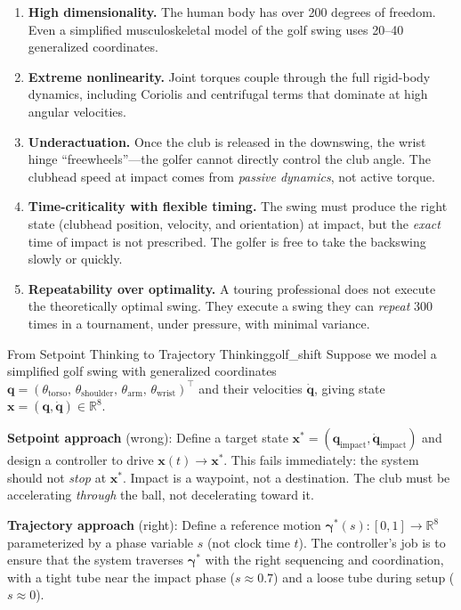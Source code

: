 \documentclass[12pt, openany]{book}
\theoremstyle{plain}
\newcommand{\state}{\bm{x}}
\newcommand{\traj}{\bm{\gamma}}
\newcommand{\Reals}{\mathbb{R}}
\begin{document}
\begin{enumerate}[label=(\roman*)]
  \item \textbf{High dimensionality.} The human body has over 200 degrees of freedom.
        Even a simplified musculoskeletal model of the golf swing uses 20--40
        generalized coordinates.
  \item \textbf{Extreme nonlinearity.} Joint torques couple through the full rigid-body
        dynamics, including Coriolis and centrifugal terms that dominate at high
        angular velocities.
  \item \textbf{Underactuation.} Once the club is released in the downswing, the
        wrist hinge ``freewheels''---the golfer cannot directly control the club angle.
        The clubhead speed at impact comes from \emph{passive dynamics}, not
        active torque.
  \item \textbf{Time-criticality with flexible timing.} The swing must produce the
        right state (clubhead position, velocity, and orientation) at impact,
        but the \emph{exact} time of impact is not prescribed. The golfer
        is free to take the backswing slowly or quickly.
  \item \textbf{Repeatability over optimality.} A touring professional does not
        execute the theoretically optimal swing. They execute a swing they
        can \emph{repeat} 300 times in a tournament, under pressure, with
        minimal variance.
\end{enumerate}

\begin{example}{From Setpoint Thinking to Trajectory Thinking}{golf_shift}
  Suppose we model a simplified golf swing with generalized coordinates
  $\bm{q} = (\theta_{\text{torso}},\, \theta_{\text{shoulder}},\,
  \theta_{\text{arm}},\, \theta_{\text{wrist}})^\top$ and their velocities
  $\dot{\bm{q}}$, giving state $\state = (\bm{q}, \dot{\bm{q}}) \in \Reals^8$.

  \textbf{Setpoint approach} (wrong): Define a target state $\state^* =
  (\bm{q}_{\text{impact}}, \dot{\bm{q}}_{\text{impact}})$ and design a controller
  to drive $\state(t) \to \state^*$. This fails immediately: the system should not
  \emph{stop} at $\state^*$. Impact is a waypoint, not a destination. The club must
  be accelerating \emph{through} the ball, not decelerating toward it.

  \textbf{Trajectory approach} (right): Define a reference motion
  $\traj^*(s): [0, 1] \to \Reals^8$ parameterized by a phase variable $s$ (not
  clock time $t$). The controller's job is to ensure that the system traverses
  $\traj^*$ with the right sequencing and coordination, with a tight tube near the
  impact phase ($s \approx 0.7$) and a loose tube during setup ($s \approx 0$).
\end{example}
\end{document}
